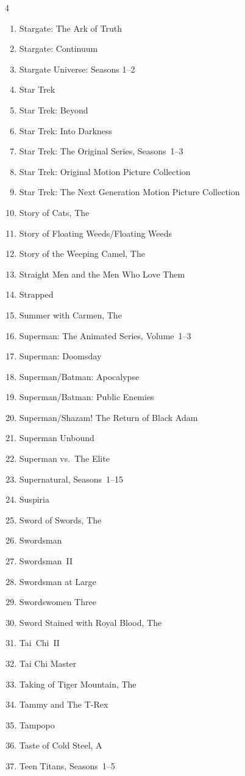 \documentclass{article}
\begin{document}
\begin{multicols}{4}
\begin{enumerate}
\item Stargate: The Ark of Truth
\item Stargate: Continuum
\item Stargate Universe: Seasons 1--2
\item Star Trek
\item Star Trek: Beyond
\item Star Trek: Into Darkness
\item Star Trek: The Original Series, Seasons~1--3
\item Star Trek: Original Motion Picture Collection
\item Star Trek: The Next Generation Motion Picture Collection
\item Story of Cats, The
\item Story of Floating Weeds/Floating Weeds
\item Story of the Weeping Camel, The
\item Straight Men and the Men Who Love Them
\item Strapped
\item Summer with Carmen, The
\item Superman: The Animated Series, Volume~1--3
\item Superman: Doomsday
\item Superman/Batman: Apocalypse
\item Superman/Batman: Public Enemies
\item Superman/Shazam!  The Return of Black Adam
\item Superman Unbound
\item Superman vs.\ The Elite
\item Supernatural, Seasons~1--15
\item Suspiria
\item Sword of Swords, The
\item Swordsman
\item Swordsman~II
\item Swordsman at Large
\item Swordswomen Three
\item Sword Stained with Royal Blood, The
\item Tai~Chi~II
\item Tai Chi Master
\item Taking of Tiger Mountain, The
\item Tammy and The T-Rex
\item Tampopo
\item Taste of Cold Steel, A
\item Teen Titans, Seasons~1--5

\end{enumerate}
\end{multicols}
\end{document}
